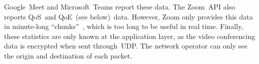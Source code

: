         Google~Meet and Microsoft~Teams report these data. The Zoom~API also reports QoS~and QoE~(see below)~data. However, Zoom only provides this data in minute-long \enquote{chunks}~\autocite{walia2019}, which is too long to be useful in real time. Finally, these statistics are only known at the application layer, as the video conferencing data is encrypted when sent through~UDP. The network operator can only see the origin and destination of each packet.




